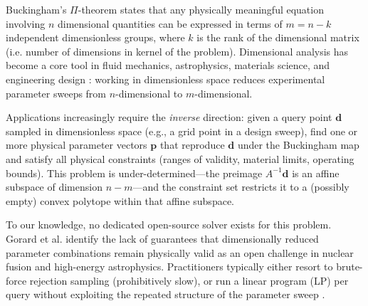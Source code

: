 \documentclass[review,onefignum,onetabnum]{./SIAM_template/siamart171218}
\begin{document}
Buckingham's $\Pi$-theorem \cite{Buckingham1914} states that any
physically meaningful equation involving $n$ dimensional quantities can be expressed in
terms of $m = n - k$ independent dimensionless groups, where $k$ is the rank of the
dimensional matrix (i.e. number of dimensions in kernel of the problem).
Dimensional analysis has become a core tool in fluid mechanics,
astrophysics, materials science, and engineering design \cite{Bakarji2022,
	BuckinghamPy2021, SalazarMeza2023, Opdahl2021}: working in dimensionless space
reduces experimental parameter sweeps from $n$-dimensional to $m$-dimensional.

Applications increasingly require the \emph{inverse} direction: given a query point
$\mathbf{d}$ sampled in dimensionless space (e.g., a grid point in a design sweep),
find one or more physical parameter vectors $\mathbf{p}$ that reproduce
$\mathbf{d}$ under the Buckingham map and satisfy all physical constraints
(ranges of validity, material limits, operating bounds).
This problem is under-determined---the preimage $A^{-1}\mathbf{d}$ is an affine
subspace of dimension $n - m$---and the constraint set restricts it to a (possibly
empty) convex polytope within that affine subspace.

To our knowledge, no dedicated open-source solver exists for this problem.
Gorard et al. \cite{Gorard2025} identify the lack of guarantees that
dimensionally reduced parameter combinations remain physically valid as an open
challenge in nuclear fusion and high-energy astrophysics.
Practitioners typically either resort to brute-force rejection sampling (prohibitively
slow), or run a linear program (LP) per query without exploiting the repeated
structure of the parameter sweep \cite{Bakarji2022, BuckinghamPy2021}.
\end{document}
